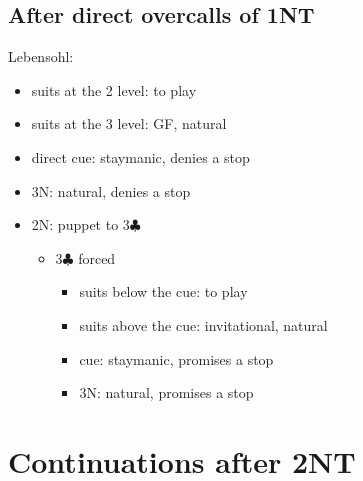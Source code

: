 \documentclass[a4paper,12pt]{article}
\begin{document}
\subsection{After direct overcalls of 1NT}

Lebensohl:

\begin{itemize}
\item suits at the 2 level: to play
\item suits at the 3 level: GF, natural
\item direct cue: staymanic, denies a stop
\item 3N: natural, denies a stop
\item 2N: puppet to 3$\clubsuit$
	\begin{itemize}
	\item 3$\clubsuit$ forced
		\begin{itemize}
		\item suits below the cue: to play
		\item suits above the cue: invitational, natural
		\item cue: staymanic, promises a stop
		\item 3N: natural, promises a stop
		\end{itemize}
	\end{itemize}
\end{itemize}

\section{Continuations after 2NT}
\end{document}
